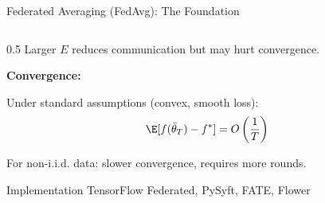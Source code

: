 \begin{frame}{Federated Averaging (FedAvg): The Foundation}
\begin{columns}
\begin{column}{0.5\textwidth}
Larger $E$ reduces communication but may hurt convergence.

\vspace{0.3cm}
\textbf{Convergence:}

Under standard assumptions (convex, smooth loss):
\[\E[f(\bar{\theta}_T) - f^*] = O\left(\frac{1}{T}\right)\]

For non-i.i.d. data: slower convergence, requires more rounds.

\vspace{0.3cm}
\begin{alertblock}{Implementation}
TensorFlow Federated, PySyft, FATE, Flower
\end{alertblock}
\end{column}
\end{columns}
\end{frame}

